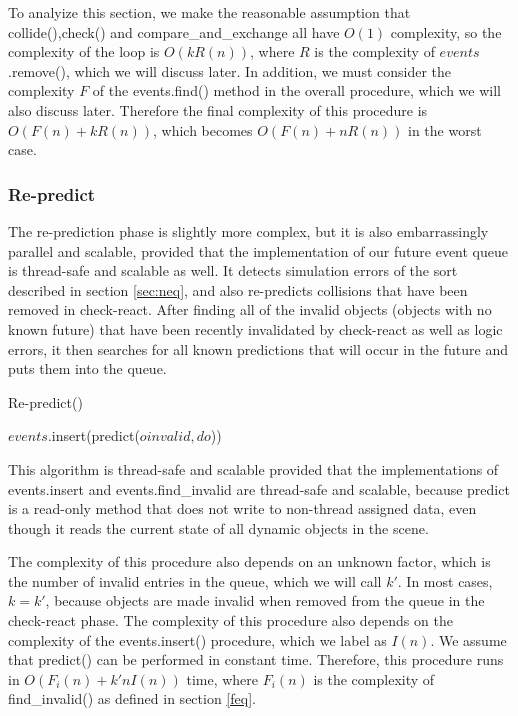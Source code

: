 \documentclass[CEJCS,PDF]{cej} %
\begin{document}
To analyize this section, we make the reasonable assumption that collide(),check() and compare\_and\_exchange all have $O(1)$ complexity, so the complexity
of the loop is $O(k R(n))$, where $R$ is the complexity of $events$.remove(), which we will discuss later.  In addition, we must consider the complexity $F$
of the events.find() method in the overall procedure, which we will also discuss later.  Therefore the final complexity of this procedure is $O(F(n)+k R(n))$, which
becomes $O(F(n)+n R(n))$ in the worst case.

\subsubsection{Re-predict}
\label{sec:repredict}
The re-prediction phase is slightly more complex, but it is also embarrassingly parallel and scalable, provided that the implementation of our future event queue is thread-safe and scalable as well.  It detects simulation errors of the sort described in section \ref{sec:neq}, and also re-predicts collisions
that have been removed in check-react.  After finding all of the invalid objects (objects with no known future) that have been recently invalidated by check-react as well as logic errors, it then
searches for all known predictions that will occur in the future and puts them into the queue.  

\begin{algorithm}
\caption{Re-predict()}
\begin{algorithmic}
\STATE {}
	\STATE {}
			\STATE $events$.insert(predict($oinvalid,do$))
		\ENDFOR
	\ENDIF
\ENDFOR
\end{algorithmic}
\end{algorithm}
This algorithm is thread-safe and scalable provided that the implementations of events.insert and events.find\_invalid are thread-safe and scalable, because predict is a read-only method that 
does not write to non-thread assigned data, even though it reads the current state of all dynamic objects in the scene.

The complexity of this procedure also depends on an unknown factor, which is the number of invalid entries in the queue, which we will call $k'$.  In most cases, $k=k'$, because objects are made invalid
when removed from the queue in the check-react phase.
The complexity of this procedure also depends on the complexity of the events.insert() procedure, which we label as $I(n)$.  We assume that predict() can be performed in constant time.
Therefore, this procedure runs in $O(F_i(n)+k' n I(n))$ time, where $F_i(n)$ is the complexity of find\_invalid() as defined in section \ref{feq}.
\end{document}

